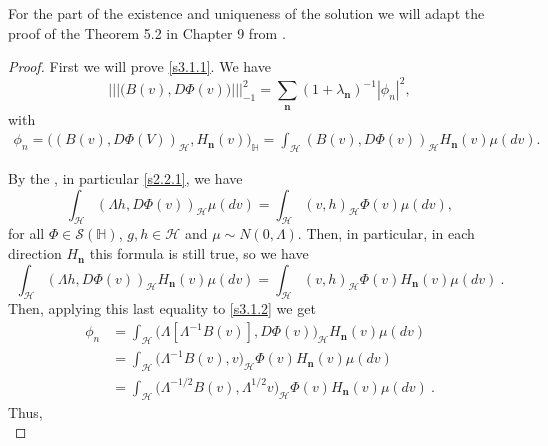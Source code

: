 \documentclass[]{interact}
\theoremstyle{plain}%
\theoremstyle{definition}
\theoremstyle{remark}
\begin{document}
        For the part of the existence and uniqueness of the solution we will 
    adapt the proof of the Theorem 5.2 in Chapter 9 from \cite{liu}.
    \begin{proof}
        First we will prove \eqref{s3.1.1}. We have
        $$
            ||| \big(B(v),D\Phi(v) \big) |||_{-1}^2 =\sum_{\mathbf{n}}
            (1+\lambda_{\mathbf{n}})^{-1}|\phi_n|^2 ,
        $$
        with
        \begin{align}
            \label{s3.1.2}
            \phi_n=
            \Big(
                (B(v),D\Phi(V))_{\mathcal{H}}, H_{\mathbf{n}}(v)
            \Big)_{\mathbb{H}}
            =\int_{\mathcal{H}} (B(v),D\Phi(v))_{\mathcal{H}} H_{\mathbf{n}}(v)
                \mu(dv).
        \end{align}
        
        By the , in particular \eqref{s2.2.1}, we have
        $$
            \int_{\mathcal{H}} (\Lambda h,D\Phi(v))_{\mathcal{H}}  \mu(dv) 
            =
                \int_{\mathcal{H}} (v,h)_{\mathcal{H}} \Phi(v)  \mu(dv) ,
        $$
        for all $\Phi\in \mathcal{S}(\mathbb{H})$, $g,h\in \mathcal{H}$ and 
        $\mu\sim N(0,\Lambda)$. Then, in particular, in each direction 
        $H_{\mathbf{n}}$ this formula is still true, so we have
        $$
            \int_{\mathcal{H}} 
                (\Lambda h,D\Phi(v))_{\mathcal{H}} H_{\mathbf{n}}(v)
                \mu(dv) =
            \int_{\mathcal{H}} (v,h)_{\mathcal{H}} \Phi(v) H_{\mathbf{n}}(v) 
            \mu(dv) \ .
        $$
        Then, applying this last equality to \eqref{s3.1.2} we get
        \begin{align*}
            \phi_n 
                &=\int_{\mathcal{H}}
                    \big(
                        \Lambda[\Lambda^{-1}B(v)],D\Phi(v)
                    \big)_{\mathcal{H}} H_{\mathbf{n}}(v)
                \mu(dv)\nonumber
            \\
                &= \int_{\mathcal{H}} 
                \big(
                    \Lambda^{-1}B(v), v 
                \big)_{\mathcal{H}} \Phi(v)
                H_{\mathbf{n}}(v) \mu(dv)\nonumber\\
                &= \int_{\mathcal{H}} 
                    \big(
                        \Lambda^{-1/2}B(v),\Lambda^{1/2}v
                    \big)_{\mathcal{H}} 
                    \Phi(v) H_{\mathbf{n}}(v) \mu(dv)
                    \ .
        \end{align*}
        Thus,
        \begin{equation}

\end{equation}
\end{proof}
\end{document}
